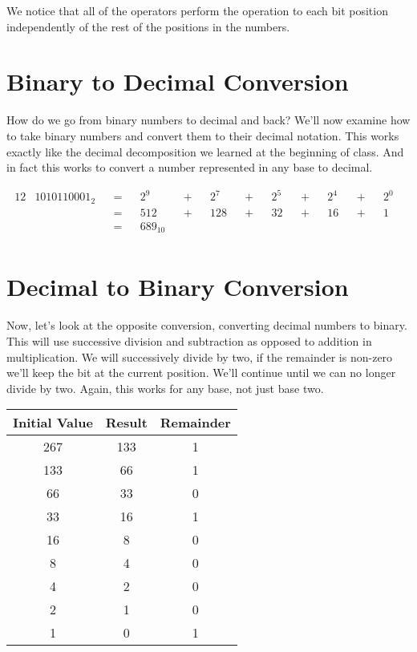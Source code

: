 We notice that all of the operators perform the operation to each bit position
independently of the rest of the positions in the numbers.

\section{Binary to Decimal Conversion}
How do we go from binary numbers to decimal and back? We’ll now examine how to
take binary numbers and convert them to their decimal notation. This works
exactly like the decimal decomposition we learned at the beginning of class.
And in fact this works to convert a number represented in any base to decimal.

\begin{alignat*}{12}
& 1010110001_2 &&=&& 2^9      &&+&& 2^7 &&+&& 2^5 &&+&& 2^4 &&+&& 2^0 & \\
&              &&=&& 512      &&+&& 128 &&+&& 32  &&+&& 16  &&+&& 1   & \\
&              &&=&& 689_{10} && &&     && &&     && &&     && &&     & \\
\end{alignat*}

\section{Decimal to Binary Conversion}
Now, let’s look at the opposite conversion, converting decimal numbers to
binary. This will use successive division and subtraction as opposed to
addition in multiplication. We will successively divide by two, if the
remainder is non-zero we’ll keep the bit at the current position. We’ll
continue until we can no longer divide by two. Again, this works for any
base, not just base two.

\begin{center}
\begin{tabular}{|c|c|c|}
\hline
\textbf{Initial Value} & \textbf{Result} & \textbf{Remainder} \\
\hline
267 & 133 & 1 \\
133 &  66 & 1 \\
 66 &  33 & 0 \\
 33 &  16 & 1 \\
 16 &   8 & 0 \\
  8 &   4 & 0 \\
  4 &   2 & 0 \\
  2 &   1 & 0 \\
  1 &   0 & 1 \\
\hline
\end{tabular}
\end{center}

